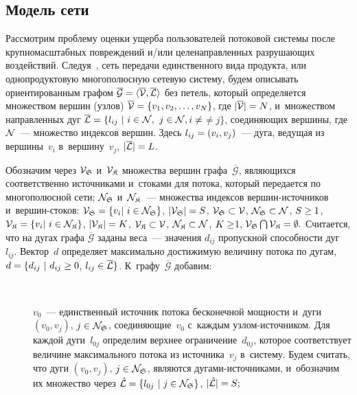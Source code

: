 \begin{multicols}{2}
\section{Модель сети}

Рассмотрим проблему оценки ущерба пользователей потоковой системы 
после крупномасштабных повреждений и/или целенаправленных разрушающих воздействий.
Следуя~\cite{ford}, сеть передачи единственного вида продукта, или 
однопродуктовую многополюсную сетевую систему, будем описывать ориентированным 
графом $\overline {\mathcal{G}} \hm= \langle \overline{\cal V}, \overline {\cal L} 
\rangle$ без петель, который определяется множеством вершин (узлов) $\overline{\cal V} 
\hm= \{v_1,v_2,\ldots,v_ N\}$, где $|\overline{\cal V}| \hm=  N$, 
и~множеством направленных дуг
$\overline {\cal L} \hm=\{l_{ij} \ | \ i \hm\in {\cal N}, \ j \hm\in {\cal N},
 i \not=$\linebreak $\not= j \}$,
соединяющих вершины, где
${\cal N}$~--- множество индексов вершин. Здесь
$l_{ij} \hm= (v_i, v_j)$~---  дуга, ведущая из вершины~$v_i$ в~вершину~$v_j$, 
 $|\overline{\cal L}|\hm = L$.

Обозначим через ${\cal V}_{\frak S}$ и~${\cal V}_{\frak K}$  
множества вершин графа~$\overline {\mathcal{G}}$, являющихся соответственно 
источниками и~стоками для потока, который передается по многополюсной  сети;
${\cal N}_{\frak S}$ и~${\cal N}_{\frak K}$~---  множества индексов вер\-шин-ис\-точ\-ни\-ков 
и~вер\-шин-сто\-ков:
${\cal V}_\SS = \{v_i | \ i \hm\in {\cal N}_\SS \}$,  $|{\cal V}_\SS|\hm = S$,  
${\cal V}_\SS \hm\subset 
{\cal V}$,  ${\cal N}_\SS \hm\subset {\cal N}$, $S \hm\geq 1$, 
${\cal V}_\SK \hm= \{v_i | \ i \in {\cal N}_\SK\}$,   
$|{\cal V}_\SK | \hm= K$, ${\cal V}_\SK \hm\subset {\cal V}$,  
${\cal N}_{\frak K} \subset {\cal N}$, $K \hm\geq $1, 
${\cal V}_\SS \bigcap {\cal V}_\SK \hm= \emptyset.$
Считается, что на дугах графа $\overline {\mathcal{G}}$ заданы веса~--- 
значения $d_{ij}$ пропускной способности дуг~$l_{ij}$. Вектор~$d$ 
определяет максимально достижимую величину потока  по дугам,
$d\hm = \{d_{ij} \ |\  d_{ij} \hm\geq 0$,  $l_{ij}\hm\in \overline{\cal L}\}$.
К~графу~$\overline {\mathcal{G}}$ добавим:
\begin{description}
\item[\,] $v_0$~---  единственный источник потока бесконечной мощности  
и~дуги $(v_0, v_j)$,   $j \hm\in {\cal N}_\SS$, соединяющие~$v_0$ 
с~каж\-дым уз\-лом-ис\-точ\-ни\-ком. Для каждой дуги~$l_{0j}$ 
определим верхнее ограничение~$d_{0j}$, которое соответствует величине 
максимального потока из источника~$v_j$ в~сис\-те\-му. Будем считать, что  
дуги $(v_0, v_j)$, $j \hm\in 
{\cal N}_\SS$, являются ду\-га\-ми-ис\-точ\-ни\-ка\-ми, и~обозначим их множество через
$ \hat{\cal L}\hm=\{l_{0 j} \ | \  j \hm\in {\cal N}_\SS \}$, $| \hat{\cal L}| \hm=  S; $\\[-15pt]


\end{description}
\end{multicols}
